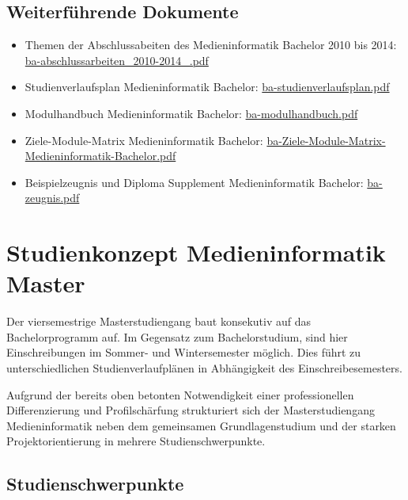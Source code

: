 \subsection{Weiterführende
Dokumente}\label{weiterfuxfchrende-dokumente-3}

\begin{itemize}
\tightlist
\item
  Themen der Abschlussabeiten des Medieninformatik Bachelor 2010 bis
  2014:
  \href{../anhaenge/ba-abschlussarbeiten_2010-2014_.pdf}{ba-abschlussarbeiten\_2010-2014\_.pdf}
\item
  Studienverlaufsplan Medieninformatik Bachelor:
  \href{../anhaenge/ba-studienverlaufsplan.pdf}{ba-studienverlaufsplan.pdf}
\item
  Modulhandbuch Medieninformatik Bachelor:
  \href{../anhaenge/ba-modulhandbuch.pdf}{ba-modulhandbuch.pdf}
\item
  Ziele-Module-Matrix Medieninformatik Bachelor:
  \href{../anhaenge/ba-Ziele-Module-Matrix-Medieninformatik-Bachelor.pdf}{ba-Ziele-Module-Matrix-Medieninformatik-Bachelor.pdf}
\item
  Beispielzeugnis und Diploma Supplement Medieninformatik Bachelor:
  \href{../anhaenge/ba-zeugnis.pdf}{ba-zeugnis.pdf}
\end{itemize}

\section{Studienkonzept Medieninformatik
Master}\label{studienkonzept-medieninformatik-master}

Der viersemestrige Masterstudiengang baut konsekutiv auf das
Bachelorprogramm auf. Im Gegensatz zum Bachelorstudium, sind hier
Einschreibungen im Sommer- und Wintersemester möglich. Dies führt zu
unterschiedlichen Studienverlaufplänen in Abhängigkeit des
Einschreibesemesters.

Aufgrund der bereits oben betonten Notwendigkeit einer professionellen
Differenzierung und Profilschärfung strukturiert sich der
Masterstudiengang Medieninformatik neben dem gemeinsamen
Grundlagenstudium und der starken Projektorientierung in mehrere
Studienschwerpunkte.

\subsection{Studienschwerpunkte}\label{studienschwerpunkte}

